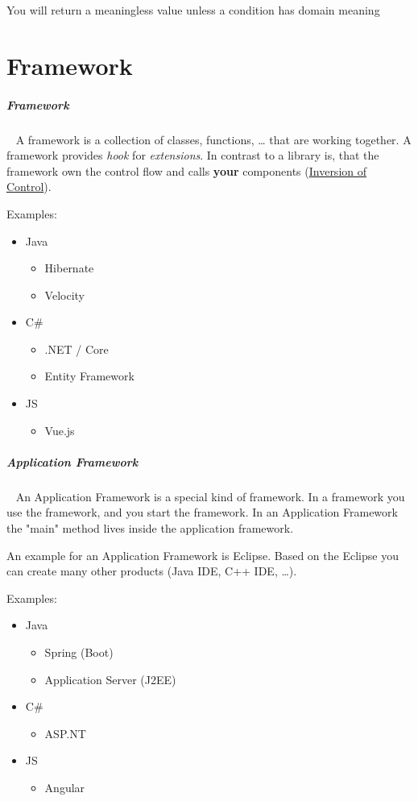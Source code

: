 \documentclass[11pt,twoside,landscape]{article}
\begin{document}
\begin{multicols}{3}
You will return a meaningless value unless a condition has domain meaning
\section{Framework}
\label{sec:org8eaa9fa}
\subparagraph{Framework} \
\label{sec:org3472158}
A framework is a collection of classes, functions, \ldots{} that are working together.
A framework provides \emph{hook} for \emph{extensions}.
In contrast to a library is, that the framework own the control flow and calls \textbf{your} components (\href{../../../roam/20230102153338-what_is_inversion_of_control.org}{Inversion of Control}).


Examples:
\begin{itemize}
\item Java
\begin{itemize}
\item Hibernate
\item Velocity
\end{itemize}
\item C\#
\begin{itemize}
\item .NET / Core
\item Entity Framework
\end{itemize}
\item JS
\begin{itemize}
\item Vue.js
\end{itemize}
\end{itemize}
\subparagraph{Application Framework} \
\label{sec:org64d09fe}
An Application Framework is a special kind of framework.
In a framework you use the framework, and you start the framework.
In an Application Framework the "main" method lives inside the application framework.

An example for an Application Framework is Eclipse.
Based on the Eclipse you can create many other products (Java IDE, C++ IDE, \ldots{}).

Examples:
\begin{itemize}
\item Java
\begin{itemize}
\item Spring (Boot)
\item Application Server (J2EE)
\end{itemize}
\item C\#
\begin{itemize}
\item ASP.NT
\end{itemize}
\item JS
\begin{itemize}
\item Angular
\end{itemize}
\end{itemize}

\end{multicols}
\end{document}

